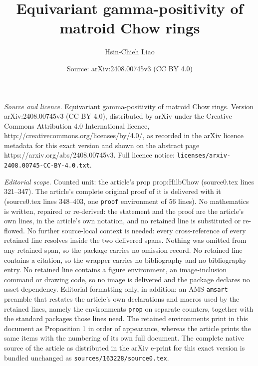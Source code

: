 \documentclass[10pt,a4paper]{amsart}
\title{Equivariant gamma-positivity of matroid Chow rings}
\author{Hsin-Chieh Liao}
\date{Source: arXiv:2408.00745v3 (CC BY 4.0)}
\begin{document}
\maketitle

\noindent\emph{Source and licence.} Equivariant gamma-positivity of matroid Chow rings. Version arXiv:2408.00745v3 (CC BY 4.0), distributed by arXiv under the Creative Commons Attribution 4.0 International licence, http://creativecommons.org/licenses/by/4.0/, as recorded in the arXiv licence metadata for this exact version and shown on the abstract page https://arxiv.org/abs/2408.00745v3. Full licence notice: \texttt{licenses/arxiv-2408.00745-CC-BY-4.0.txt}.\par\smallskip

\noindent\textit{Editorial scope.} Counted unit: the article's prop prop:HilbChow (source0.tex lines 321--347). The article's complete original proof of it is delivered with it (source0.tex lines 348--403, one \texttt{proof} environment of 56 lines). No mathematics is written, repaired or re-derived: the statement and the proof are the article's own lines, in the article's own notation, and no retained line is substituted or re-flowed.  No further source-local context is needed: every cross-reference of every retained line resolves inside the two delivered spans.  Nothing was omitted from any retained span, so the package carries no omission record.  No retained line contains a citation, so the wrapper carries no bibliography and no bibliography entry.  No retained line contains a figure environment, an image-inclusion command or drawing code, so no image is delivered and the package declares no asset dependency.  Editorial formatting only, in addition: an AMS \texttt{amsart} preamble that restates the article's own declarations and macros used by the retained lines, namely the environments \texttt{prop} on separate counters, together with the standard packages those lines need.  The retained environments print in this document as Proposition 1 in order of appearance, whereas the article prints the same items with the numbering of its own full document.  The complete native source of the article as distributed in the arXiv e-print for this exact version is bundled unchanged as \texttt{sources/163228/source0.tex}.
\end{document}
